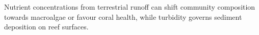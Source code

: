 

Nutrient concentrations from terrestrial runoff can shift community composition towards macroalgae or favour coral health, while turbidity governs sediment deposition on reef surfaces. %

